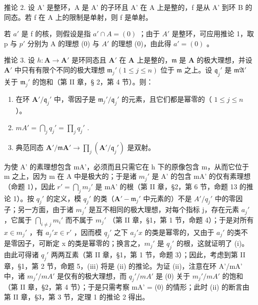 推论 2. 设 A' 是整环，A 是 A' 的子环且 A' 在 A 上是整的，f 是从 A' 到环 B 的同态。若 f 在 A 上的限制是单射，则 f 是单射。

若 \(a'\) 是 f 的核，则假设是指 \(a' \cap A = (0)\) ；由于 \(A'\) 是整环，可应用推论 1，取 p 与 \(p'\) 分别为 A 的理想 (0) 与 \(A'\) 的理想 (0)，由此得 \(a' = (0)\) 。

推论 3. 设 \(h: \mathbf{A} \to \mathbf{A}'\) 是环同态且 \(\mathbf{A}'\) 在 \(\mathbf{A}\) 上是整的，\(\mathfrak{m}\) 是 \(\mathbf{A}\) 的极大理想，并设 \(\mathbf{A}'\) 中只有有限个不同的极大理想 \(\mathfrak{m}_j' (1 \leqslant j \leqslant n)\) 位于 \(\mathfrak{m}\) 之上。设 \(\mathfrak{q}_j'\) 是 \(\mathfrak{mA}'\) 关于 \(\mathfrak{m}_j'\) 的饱和（第 II 章，§ 2，第 4 节）。则：

\begin{enumerate}
\def\labelenumi{(\roman{enumi})}
\item
  在环 \(\mathbf{A}' / \mathfrak{q}_j'\) 中，零因子是 \(\mathfrak{m}_j' / \mathfrak{q}_j'\) 的元素，且它们都是幂零的（ \(1 \leqslant j \leqslant n\) ）。
\item
  \(mA' = \bigcap_{j} q_{j}' = \prod_{j} q_{j}'\) .
\item
  典范同态 \(\mathbf{A}' / \mathfrak{m}\mathbf{A}' \to \prod_j (\mathbf{A}' / \mathfrak{q}_j')\) 是双射。
\end{enumerate}

为使 A' 的素理想包含 mA'，必须而且只需它在 h 下的原像包含 m，从而它位于 m 之上，因为 m 在 A 中是极大的；于是诸 \(m_{j}'\) 是 A' 的包含 mA' 的仅有素理想（命题 1），因此 \(r' = \bigcap_{j} m_{j}'\) 是 mA' 的根（第 II 章，§2，第 6 节，命题 13 的推论 1）。按 \(q_{j}'\) 的定义，模 \(q_{j}'\) 的类（\(\mathbf{A}' - \mathfrak{m}_{j}'\) 中元素的）不是 \(A'/q_{j}'\) 中的零因子；另一方面，由于诸 \(m_{j}'\) 是互不相同的极大理想，对每个指标 j，存在元素 \(a_{j}'\) ，它属于 \(\bigcap_{i \neq j} m_{i}'\) 而不属于 \(m_{j}'\) （第 II 章，§1，第 1 节，命题 4）；于是对所有 \(x \in m_{j}'\) ，有 \(a_{j}'x \in r'\) ，因而模 \(q_{j}'\) 之下 \(a_{j}'x\) 的类是幂零的，又由于 \(a_{j}'\) 的类不是零因子，可断定 x 的类是幂零的；换言之，\(m_{j}'\) 是 \(q_{j}'\) 的根，这就证明了 (i)。由此可得诸 \(q_{j}'\) 两两互素（第 II 章，§1，第 1 节，命题 3）；因此，考虑到第 II 章，§1，第 2 节，命题 5，(iii) 将是 (ii) 的推论。为证 (ii)，注意在环 A'/mA' 中，诸 \(m_{j}'/mA'\) 是仅有的极大理想，而 \(q_{j}'/mA'\) 是 (0) 关于 \(m_{j}'/mA'\) 的饱和（第 II 章，§2，第 4 节）；于是只需考察 mA' = (0) 的情形；此时 (ii) 的断言由第 II 章，§3，第 3 节，定理 1 的推论 2 得出。

